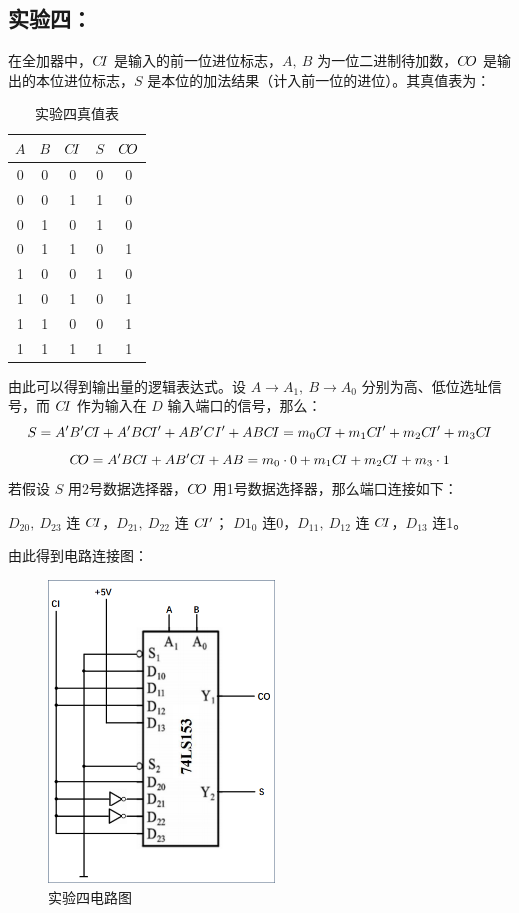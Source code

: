 \documentclass[a4paper,11pt,UTF8]{ctexart}
\begin{document}
  
 \subsection{实验四：\expd}
  \p 在全加器中，$C\negthinspace I$ 是输入的前一位进位标志，$A,\ B$ 为一位二进制待加数，$C\negthinspace O$ 是输出的本位进位标志，$S$ 是本位的加法结果（计入前一位的进位）。其真值表为：
  \begin{table}[H]
   \centering
   \begin{tabular}{|ccc|cc|}\hline
    $A$ &$B$ &$C\negthinspace I$ &$S$ &$C\negthinspace O$
    \\\hline
    0 &0 &0		&0 &0\\
    0 &0 &1 	&1 &0\\
    0 &1 &0 	&1 &0\\
    0 &1 &1 	&0 &1\\
    1 &0 &0 	&1 &0\\
    1 &0 &1 	&0 &1\\
    1 &1 &0 	&0 &1\\
    1 &1 &1 	&1 &1
    \\\hline
   \end{tabular}
   \caption{实验四真值表}
   \label{tab:Exp04}
  \end{table}
  \p 由此可以得到输出量的逻辑表达式。设 $A\to A_1,\ B\to A_0$ 分别为高、低位选址信号，而 $C\negthinspace I$ 作为输入在 $D$ 输入端口的信号，那么：
  \[ S=A'B'C\negthinspace I+A'BC\negthinspace I'+AB'CI'+ABC\negthinspace I=m_0C\negthinspace I+m_1C\negthinspace I'+m_2C\negthinspace I'
  +m_3C\negthinspace I \]
  \[ C\negthinspace O=A'BC\negthinspace I+AB'C\negthinspace I+AB=m_0\cdot0+m_1C\negthinspace I+m_2C\negthinspace I+m_3\cdot1 \]
  \p 若假设 $S$ 用2号数据选择器，$C\negthinspace O$ 用1号数据选择器，那么端口连接如下：
  \begin{center}
   \kaishu $D_{20},\ D_{23}$ 连 $C\negthinspace I$，$D_{21},\ D_{22}$ 连 $C\negthinspace I'$；
  \p $D{1_0}$ 连0，$D_{11},\ D_{12}$ 连 $C\negthinspace I$，$D_{13}$ 连1。
  \end{center}

  
  \p 由此得到电路连接图：
  \begin{figure}[H]
   \centering
   \includegraphics[width=6cm]{Exp04}
   \caption{实验四电路图}
   \label{fig:Exp04}
  \end{figure}
\end{document}
